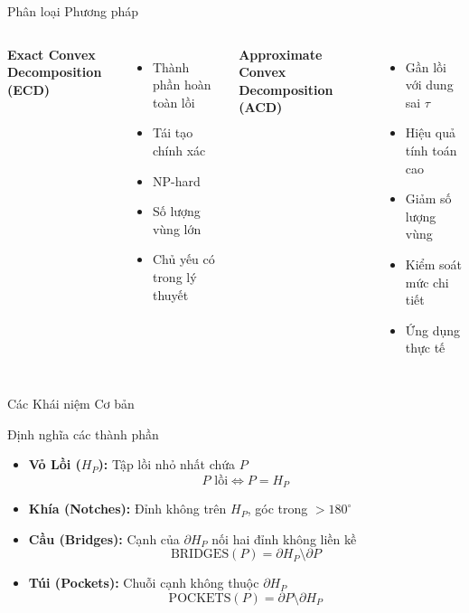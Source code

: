 \documentclass[aspectratio=169]{beamer}
\begin{document}
\begin{frame}{Phân loại Phương pháp}
    \begin{columns}[T]
        \textbf{Exact Convex Decomposition (ECD)}
        \begin{itemize}
            \item Thành phần hoàn toàn lồi
            \item Tái tạo chính xác
            \item NP-hard
            \item Số lượng vùng lớn
            \item Chủ yếu có trong lý thuyết
        \end{itemize}

        \textbf{Approximate Convex Decomposition (ACD)}
        \begin{itemize}
            \item Gần lồi với dung sai $\tau$
            \item Hiệu quả tính toán cao
            \item Giảm số lượng vùng
            \item Kiểm soát mức chi tiết
            \item Ứng dụng thực tế
        \end{itemize}
    \end{columns}
\end{frame}


\begin{frame}{Các Khái niệm Cơ bản}

    \begin{block}{Định nghĩa các thành phần}
        \begin{itemize}
            \item \textbf{Vỏ Lồi ($H_P$):} Tập lồi nhỏ nhất chứa $P$
                  \[
                      P \text{ lồi} \Leftrightarrow P = H_P
                  \]

            \item \textbf{Khía (Notches):} Đỉnh không trên $H_P$, góc trong $> 180^\circ$

            \item \textbf{Cầu (Bridges):} Cạnh của $\partial H_P$ nối hai đỉnh không liền kề
                  \[
                      \text{BRIDGES}(P) = \partial H_P \setminus \partial P
                  \]

            \item \textbf{Túi (Pockets):} Chuỗi cạnh không thuộc $\partial H_P$
                  \[
                      \text{POCKETS}(P) = \partial P \setminus \partial H_P
                  \]
        \end{itemize}
    \end{block}

\end{frame}
\end{document}
